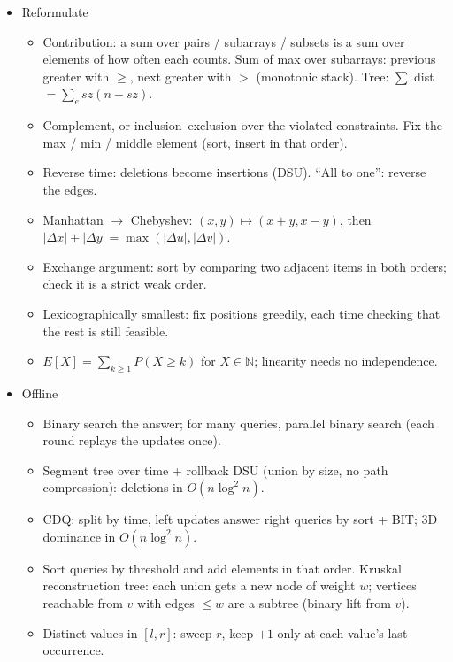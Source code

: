 \begin{itemize}
\item Reformulate
\begin{itemize}
  \item Contribution: a sum over pairs / subarrays / subsets is a sum over elements of how often each counts. Sum of max over subarrays: previous greater with $\ge$, next greater with $>$ (monotonic stack). Tree: $\sum$ dist $= \sum_{e} sz(n - sz)$.
  \item Complement, or inclusion--exclusion over the violated constraints. Fix the max / min / middle element (sort, insert in that order).
  \item Reverse time: deletions become insertions (DSU). ``All to one'': reverse the edges.
  \item Manhattan $\to$ Chebyshev: $(x, y) \mapsto (x + y, x - y)$, then $|\Delta x| + |\Delta y| = \max(|\Delta u|, |\Delta v|)$.
  \item Exchange argument: sort by comparing two adjacent items in both orders; check it is a strict weak order.
  \item Lexicographically smallest: fix positions greedily, each time checking that the rest is still feasible.
  \item $E[X] = \sum_{k \ge 1} P(X \ge k)$ for $X \in \mathbb{N}$; linearity needs no independence.
\end{itemize}

\item Offline
\begin{itemize}
  \item Binary search the answer; for many queries, parallel binary search (each round replays the updates once).
  \item Segment tree over time + rollback DSU (union by size, no path compression): deletions in $O(n\log^2 n)$.
  \item CDQ: split by time, left updates answer right queries by sort + BIT; 3D dominance in $O(n \log^2 n)$.
  \item Sort queries by threshold and add elements in that order. Kruskal reconstruction tree: each union gets a new node of weight $w$; vertices reachable from $v$ with edges $\le w$ are a subtree (binary lift from $v$).
  \item Distinct values in $[l, r]$: sweep $r$, keep $+1$ only at each value's last occurrence.
\end{itemize}


\end{itemize}
